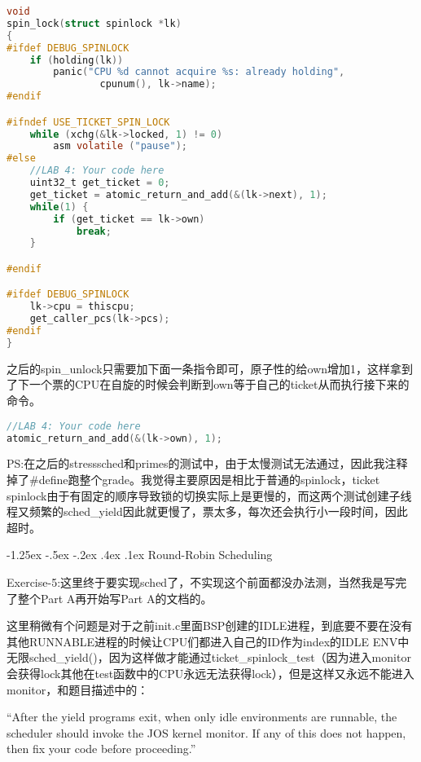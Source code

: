 \documentclass[11pt,a4paper]{article}
\makeatletter
\newcommand{\sihao}{\fontsize{14pt}{\baselineskip}\selectfont}
\renewcommand\subsection{\@startsection{subsection}{1}{\z@}%
{-1.25ex \@plus -.5ex \@minus -.2ex}%
{.4ex \@plus .1ex}%
{\normalfont\sihao\fontspec{黑体}}}
\makeatother
\begin{document}
\setmainfont{Consolas}
\begin{lstlisting}[language={C},firstnumber=1,title=kern/spinlock.c] 
void
spin_lock(struct spinlock *lk)
{
#ifdef DEBUG_SPINLOCK
	if (holding(lk))
		panic("CPU %d cannot acquire %s: already holding",
				cpunum(), lk->name);
#endif

#ifndef USE_TICKET_SPIN_LOCK
	while (xchg(&lk->locked, 1) != 0)
		asm volatile ("pause");
#else
	//LAB 4: Your code here
	uint32_t get_ticket = 0;
	get_ticket = atomic_return_and_add(&(lk->next), 1);
	while(1) {
		if (get_ticket == lk->own)
			break;
	}

#endif

#ifdef DEBUG_SPINLOCK
	lk->cpu = thiscpu;
	get_caller_pcs(lk->pcs);
#endif
}
\end{lstlisting}
\setmainfont[BoldFont=黑体]{宋体}

之后的spin\_unlock只需要加下面一条指令即可，原子性的给own增加1，这样拿到了下一个票的CPU在自旋的时候会判断到own等于自己的ticket从而执行接下来的命令。

\setmainfont{Consolas}
\begin{lstlisting}[language={C},firstnumber=1,title=kern/spinlock.c] 
//LAB 4: Your code here
atomic_return_and_add(&(lk->own), 1);
\end{lstlisting}
\setmainfont[BoldFont=黑体]{宋体}

PS:在之后的stresssched和primes的测试中，由于太慢测试无法通过，因此我注释掉了\#define跑整个grade。我觉得主要原因是相比于普通的spinlock，ticket spinlock由于有固定的顺序导致锁的切换实际上是更慢的，而这两个测试创建子线程又频繁的sched\_yield因此就更慢了，票太多，每次还会执行小一段时间，因此超时。

\subsection{Round-Robin Scheduling}

\color{red}Exercise-5:\color{black}这里终于要实现sched了，不实现这个前面都没办法测，当然我是写完了整个Part A再开始写Part A的文档的。

这里稍微有个问题是对于之前init.c里面BSP创建的IDLE进程，到底要不要在没有其他RUNNABLE进程的时候让CPU们都进入自己的ID作为index的IDLE ENV中无限sched\_yield()，因为这样做才能通过ticket\_spinlock\_test（因为进入monitor会获得lock其他在test函数中的CPU永远无法获得lock），但是这样又永远不能进入monitor，和题目描述中的：

“After the yield programs exit, when only idle environments are runnable, the scheduler should invoke the JOS kernel monitor. If any of this does not happen, then fix your code before proceeding.”
\end{document}
